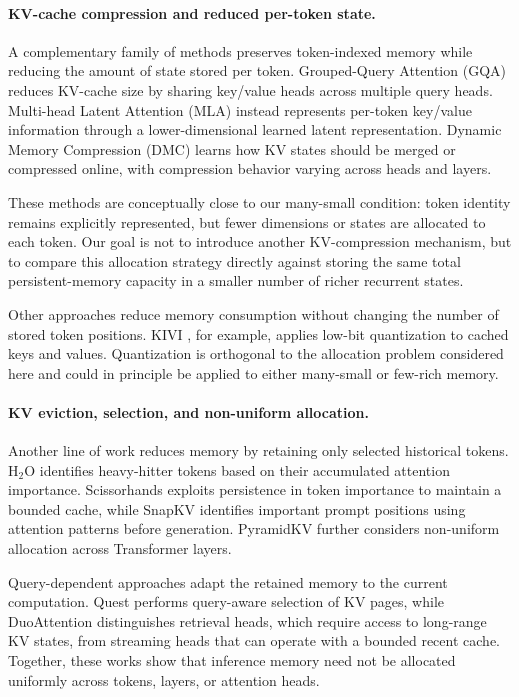 \documentclass[10pt]{article} %
\begin{document}
\paragraph{KV-cache compression and reduced per-token state.}
A complementary family of methods preserves token-indexed memory while
reducing the amount of state stored per token. Grouped-Query Attention
(GQA) \citep{ainslie2023gqa} reduces KV-cache size by sharing key/value
heads across multiple query heads. Multi-head Latent Attention (MLA)
\citep{deepseek2024v2} instead represents per-token key/value information
through a lower-dimensional learned latent representation. Dynamic Memory
Compression (DMC) \citep{nawrot2024dmc} learns how KV states should be
merged or compressed online, with compression behavior varying across
heads and layers.

These methods are conceptually close to our many-small condition: token
identity remains explicitly represented, but fewer dimensions or states
are allocated to each token. Our goal is not to introduce another
KV-compression mechanism, but to compare this allocation strategy directly
against storing the same total persistent-memory capacity in a smaller
number of richer recurrent states.

Other approaches reduce memory consumption without changing the number of
stored token positions. KIVI \citep{liu2024kivi}, for example, applies
low-bit quantization to cached keys and values. Quantization is orthogonal
to the allocation problem considered here and could in principle be
applied to either many-small or few-rich memory.

\paragraph{KV eviction, selection, and non-uniform allocation.}
Another line of work reduces memory by retaining only selected historical
tokens. H$_2$O \citep{zhang2023h2o} identifies heavy-hitter tokens based on
their accumulated attention importance. Scissorhands
\citep{liu2023scissorhands} exploits persistence in token importance to
maintain a bounded cache, while SnapKV \citep{li2024snapkv} identifies
important prompt positions using attention patterns before generation.
PyramidKV \citep{cai2025pyramidkv} further considers non-uniform allocation
across Transformer layers.

Query-dependent approaches adapt the retained memory to the current
computation. Quest \citep{tang2024quest} performs query-aware selection of
KV pages, while DuoAttention \citep{xiao2025duoattention} distinguishes
retrieval heads, which require access to long-range KV states, from
streaming heads that can operate with a bounded recent cache. Together,
these works show that inference memory need not be allocated uniformly
across tokens, layers, or attention heads.
\end{document}
